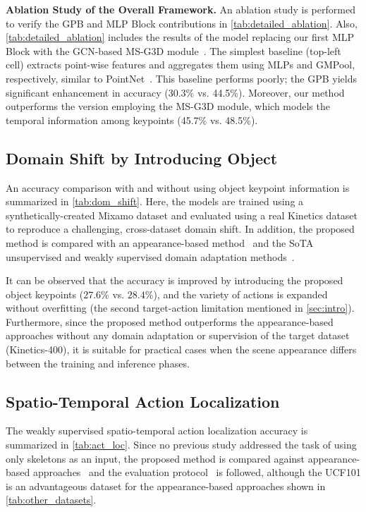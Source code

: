 \documentclass[10pt,twocolumn,letterpaper]{article}
\begin{document}
\noindent \textbf{Ablation Study of the Overall Framework.} 
An ablation study is performed to verify the GPB and MLP Block contributions in \cref{tab:detailed_ablation}.
Also, \cref{tab:detailed_ablation} includes the results of the model replacing our first MLP Block with the GCN-based MS-G3D module~\cite{Liu2020CVPR}.
The simplest baseline (top-left cell) extracts point-wise features and aggregates them using MLPs and GMPool, respectively, similar to PointNet~\cite{Qi2017CVPR}. 
This baseline performs poorly; the GPB yields significant enhancement in accuracy (30.3\% vs. 44.5\%).
Moreover, our method outperforms the version employing the MS-G3D module, which models the temporal information among keypoints (45.7\% vs. 48.5\%).

\subsection{Domain Shift by Introducing Object}
 \label{sec:domain_shift}
An accuracy comparison with and without using object keypoint information is summarized in \cref{tab:dom_shift}.
Here, the models are trained using a synthetically-created Mixamo dataset and evaluated using a real Kinetics dataset to reproduce a challenging, cross-dataset domain shift.
In addition, the proposed method is compared with an appearance-based method~\cite{Carreira2017CVPR} and the SoTA unsupervised and weakly supervised domain adaptation methods~\cite{Chen2019ICCV,Costa2022WACV}.

It can be observed that the accuracy is improved by introducing the proposed object keypoints ($27.6\%$ vs. $28.4\%$), and the variety of actions is expanded without overfitting (the second target-action limitation mentioned in \cref{sec:intro}).
Furthermore, since the proposed method outperforms the appearance-based approaches without any domain adaptation or supervision of the target dataset (Kinetics-400), it is suitable for practical cases when the scene appearance differs between the training and inference phases.


\subsection{Spatio-Temporal Action Localization}
The weakly supervised spatio-temporal action localization accuracy is summarized in \cref{tab:act_loc}.
Since no previous study addressed the task of using only skeletons as an input, the proposed method is compared against appearance-based approaches~\cite{Victor2020CVIU,Cheron2018Neurips,Anurag2020ECCV} and the evaluation protocol~\cite{Anurag2020ECCV} is followed, although the UCF101 is an advantageous dataset for the appearance-based approaches shown in \cref{tab:other_datasets}.
\end{document}
